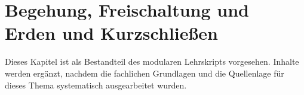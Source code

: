 \chapter{Begehung, Freischaltung und Erden und Kurzschließen}
\label{chap:16-begehung-freischaltung-euk}

Dieses Kapitel ist als Bestandteil des modularen Lehrskripts vorgesehen.
Inhalte werden ergänzt, nachdem die fachlichen Grundlagen und die
Quellenlage für dieses Thema systematisch ausgearbeitet wurden.
